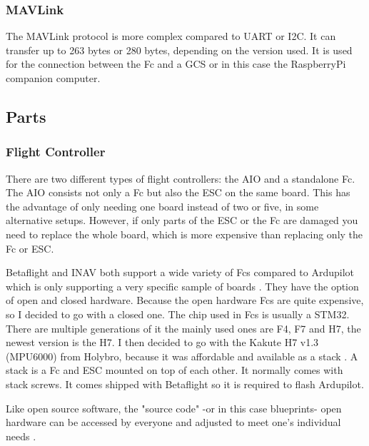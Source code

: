 \documentclass[svgnames]{article}
\begin{document}
	\subsubsection{MAVLink}
	The MAVLink protocol is more complex compared to \gls{UART} or \gls{I2C}. It can transfer up to 263 bytes or 280 bytes, depending on the version used. It is used for the connection between the \gls{Fc} and a \gls{GCS} or in this case the RaspberryPi companion computer.
	\subsection{Parts}
	
	\subsubsection[Fc]{Flight Controller}
	There are two different types of flight controllers: the \gls{AIO} and a standalone \gls{Fc}. The \gls{AIO} consists not only a \gls{Fc} but also the \gls{ESC} on the same board. This has the advantage of only needing one board instead of two or five, in some alternative setups. However, if only parts of the \gls{ESC} or the \gls{Fc} are damaged you need to replace the whole board, which is more expensive than replacing only the \gls{Fc} or \gls{ESC}. 
	
	Betaflight and INAV both support a wide variety of \glspl{Fc} compared to Ardupilot which is only supporting a very specific sample of boards \cite{FcSupport}. They have the option of open and closed hardware. Because the open hardware \glspl{Fc} are quite expensive, so I decided to go with a closed one. The chip used in \glspl{Fc} is usually a STM32. There are multiple generations of it the mainly used ones are F4, F7 and H7, the newest version is the H7. I then decided to go with the Kakute H7 v1.3 (MPU6000) from Holybro, because it was affordable and available as a stack \cite{KakuteH7}. A stack is a \gls{Fc} and \gls{ESC} mounted on top of each other. It normally comes with stack screws. It comes shipped with Betaflight so it is required to flash Ardupilot. 
	\begin{Explanation}
		\item Like open source software, the "source code" -or in this case blueprints- open hardware can be accessed by everyone and adjusted to meet one's individual needs \cite{openhardware}.
	\end{Explanation}
\end{document}
